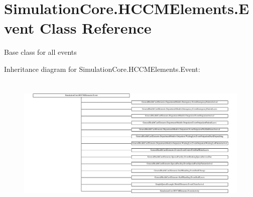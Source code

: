 \hypertarget{class_simulation_core_1_1_h_c_c_m_elements_1_1_event}{}\section{Simulation\+Core.\+H\+C\+C\+M\+Elements.\+Event Class Reference}
\label{class_simulation_core_1_1_h_c_c_m_elements_1_1_event}


Base class for all events  


Inheritance diagram for Simulation\+Core.\+H\+C\+C\+M\+Elements.\+Event\+:\begin{figure}[H]
\begin{center}
\leavevmode
\includegraphics[height=6.531882cm]{class_simulation_core_1_1_h_c_c_m_elements_1_1_event}
\end{center}
\end{figure}

